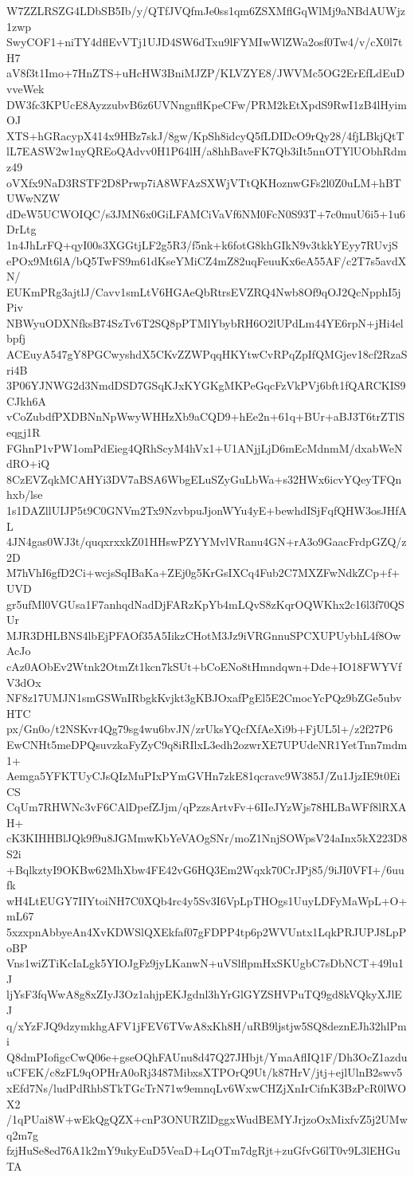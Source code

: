W7ZZLRSZG4LDbSB5Ib/y/QTfJVQfmJe0ss1qm6ZSXMflGqWlMj9aNBdAUWjz1zwp
SwyCOF1+niTY4dflEvVTj1UJD4SW6dTxu9lFYMIwWlZWa2osf0Tw4/v/cX0l7tH7
aV8f3t1Imo+7HnZTS+uHcHW3BniMJZP/KLVZYE8/JWVMc5OG2ErEfLdEuDvveWek
DW3fc3KPUcE8AyzzubvB6z6UVNngnflKpeCFw/PRM2kEtXpdS9RwI1zB4lHyimOJ
XTS+hGRacypX414x9HBz7skJ/8gw/KpSh8idcyQ5fLDIDcO9rQy28/4fjLBkjQtT
lL7EASW2w1nyQREoQAdvv0H1P64lH/a8hhBaveFK7Qb3iIt5nnOTYlUObhRdmz49
oVXfx9NaD3RSTF2D8Prwp7iA8WFAzSXWjVTtQKHoznwGFs2l0Z0uLM+hBTUWwNZW
dDeW5UCWOIQC/s3JMN6x0GiLFAMCiVaVf6NM0FcN0S93T+7c0muU6i5+1u6DrLtg
1n4JhLrFQ+qyI00s3XGGtjLF2g5R3/f5nk+k6fotG8khGIkN9v3tkkYEyy7RUvjS
ePOx9Mt6lA/bQ5TwFS9m61dKseYMiCZ4mZ82uqFeuuKx6eA55AF/c2T7s5avdXN/
EUKmPRg3ajtlJ/Cavv1smLtV6HGAeQbRtrsEVZRQ4Nwb8Of9qOJ2QcNpphI5jPiv
NBWyuODXNfksB74SzTv6T2SQ8pPTMlYbybRH6O2lUPdLm44YE6rpN+jHi4elbpfj
ACEuyA547gY8PGCwyshdX5CKvZZWPqqHKYtwCvRPqZpIfQMGjev18cf2RzaSri4B
3P06YJNWG2d3NmdDSD7GSqKJxKYGKgMKPeGqcFzVkPVj6bft1fQARCKIS9CJkh6A
vCoZubdfPXDBNnNpWwyWHHzXb9aCQD9+hEe2n+61q+BUr+aBJ3T6trZTlSeqgj1R
FGhnP1vPW1omPdEieg4QRhScyM4hVx1+U1ANjjLjD6mEcMdnmM/dxabWeNdRO+iQ
8CzEVZqkMCAHYi3DV7aBSA6WbgELuSZyGuLbWa+s32HWx6icvYQeyTFQnhxb/lse
1s1DAZllUIJP5t9C0GNVm2Tx9NzvbpuJjonWYu4yE+bewhdISjFqfQHW3osJHfAL
4JN4gas0WJ3t/quqxrxxkZ01HHswPZYYMvlVRanu4GN+rA3o9GaacFrdpGZQ/z2D
M7hVhI6gfD2Ci+wcjsSqIBaKa+ZEj0g5KrGsIXCq4Fub2C7MXZFwNdkZCp+f+UVD
gr5ufMl0VGUsa1F7anhqdNadDjFARzKpYb4mLQvS8zKqrOQWKhx2c16l3f70QSUr
MJR3DHLBNS4lbEjPFAOf35A5IikzCHotM3Jz9iVRGnnuSPCXUPUybhL4f8OwAcJo
cAz0AObEv2Wtnk2OtmZt1kcn7kSUt+bCoENo8tHmndqwn+Dde+IO18FWYVfV3dOx
NF8z17UMJN1smGSWnIRbgkKvjkt3gKBJOxafPgEl5E2CmocYcPQz9bZGe5ubvHTC
px/Gn0o/t2NSKvr4Qg79sg4wu6bvJN/zrUksYQcfXfAeXi9b+FjUL5l+/z2f27P6
EwCNHt5meDPQsuvzkaFyZyC9q8iRIlxL3edh2ozwrXE7UPUdeNR1YetTnn7mdm1+
Aemga5YFKTUyCJsQIzMuPIxPYmGVHn7zkE81qcravc9W385J/Zu1JjzIE9t0EiCS
CqUm7RHWNc3vF6CAlDpefZJjm/qPzzsArtvFv+6IIeJYzWjs78HLBaWFf8lRXAH+
cK3KIHHBlJQk9f9u8JGMmwKbYeVAOgSNr/moZ1NnjSOWpsV24aInx5kX223D8S2i
+BqlkztyI9OKBw62MhXbw4FE42vG6HQ3Em2Wqxk70CrJPj85/9iJI0VFI+/6uufk
wH4LtEUGY7IIYtoiNH7C0XQb4rc4y5Sv3I6VpLpTHOgs1UuyLDFyMaWpL+O+mL67
5xzxpnAbbyeAn4XvKDWSlQXEkfaf07gFDPP4tp6p2WVUntx1LqkPRJUPJ8LpPoBP
Vns1wiZTiKcIaLgk5YIOJgFz9jyLKanwN+uVSlflpmHxSKUgbC7sDbNCT+49lu1J
ljYsF3fqWwA8g8xZIyJ3Oz1ahjpEKJgdnl3hYrGlGYZSHVPuTQ9gd8kVQkyXJlEJ
q/xYzFJQ9dzymkhgAFV1jFEV6TVwA8xKh8H/uRB9ljstjw5SQ8deznEJh32hlPmi
Q8dmPIofigcCwQ06e+gseOQhFAUnu8d47Q27JHbjt/YmaAflIQ1F/Dh3OcZ1azdu
uCFEK/c8zFL9qOPHrA0oRj3487MibxsXTPOrQ9Ut/k87HrV/jtj+ejlUlnB2swv5
xEfd7Ns/ludPdRhbSTkTGcTrN71w9emnqLv6WxwCHZjXnIrCifnK3BzPcR0lWOX2
/1qPUai8W+wEkQgQZX+cnP3ONURZlDggxWudBEMYJrjzoOxMixfvZ5j2UMwq2m7g
fzjHuSe8ed76A1k2mY9ukyEuD5VeaD+LqOTm7dgRjt+zuGfvG6lT0v9L3lEHGuTA
